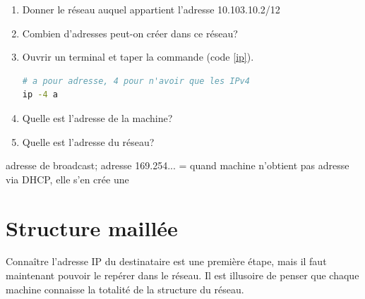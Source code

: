 \documentclass[a4paper,11pt]{article}
\begin{document}
\begin{activite}
    \begin{enumerate}
        \item Donner le réseau auquel appartient l'adresse 10.103.10.2/12
        \item Combien d'adresses peut-on créer dans ce réseau?
        \item Ouvrir un terminal et taper la commande (code \ref{ip}).
        \begin{center}
            \begin{lstlisting}[language=bash]
# a pour adresse, 4 pour n'avoir que les IPv4
ip -4 a
            \end{lstlisting}
            \label{ip}
        \end{center}

        \item Quelle est l'adresse de la machine?
        \item Quelle est l'adresse du réseau?
    \end{enumerate}
\end{activite}
\begin{commentprof}
adresse de broadcast; adresse 169.254... = quand machine n'obtient pas adresse via DHCP, elle s'en crée une
\end{commentprof}
\section{Structure maillée}
Connaître l'adresse IP du destinataire est une première étape, mais il faut maintenant pouvoir le repérer dans le réseau. Il est illusoire de penser que chaque machine connaisse la totalité de la structure du réseau.
\end{document}
